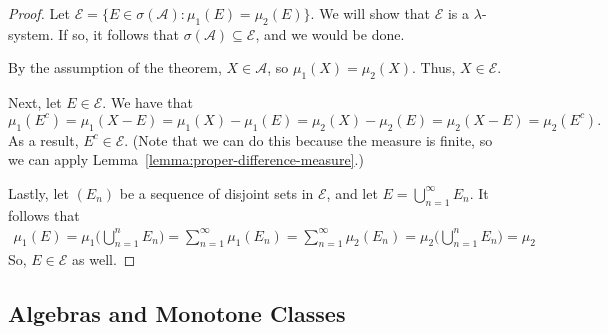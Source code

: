 \documentclass[10pt]{article}
\newcommand{\mcal}[1]{\mathcal{#1}}
\begin{document}
\begin{itemize}
  \begin{proof}
    Let $\mcal{E} = \{ E \in \sigma(\mcal{A}) : \mu_1(E) = \mu_2(E) \}$. We will show that $\mcal{E}$ is a $\lambda$-system. If so, it follows that $\sigma(\mcal{A}) \subseteq \mcal{E}$, and we would be done.

    By the assumption of the theorem, $X \in \mcal{A}$, so $\mu_1(X) = \mu_2(X)$. Thus, $X \in \mcal{E}$.

    Next, let $E \in \mcal{E}$. We have that $$\mu_1(E^c) = \mu_1(X - E) = \mu_1(X) - \mu_1(E) = \mu_2(X) - \mu_2(E) = \mu_2(X - E) = \mu_2(E^c).$$ As a result, $E^c \in \mcal{E}$. (Note that we can do this because the measure is finite, so we can apply Lemma~\ref{lemma:proper-difference-measure}.) 

    Lastly, let $(E_n)$ be a sequence of disjoint sets in $\mcal{E}$, and let $E = \bigcup_{n=1}^\infty E_n$. It follows that
    \begin{align*}
      \mu_1(E)
      = \mu_1\bigg( \bigcup_{n=1}^n E_n \bigg)
      = \sum_{n=1}^\infty \mu_1(E_n)
      = \sum_{n=1}^\infty \mu_2(E_n)
      = \mu_2\bigg( \bigcup_{n=1}^n E_n \bigg)
      = \mu_2
    \end{align*}
    So, $E \in \mcal{E}$ as well.
  \end{proof}  
\end{itemize}

\subsection{Algebras and Monotone Classes}
\end{document}
